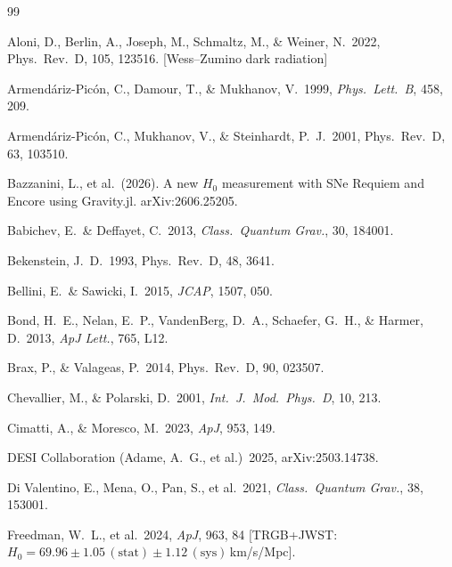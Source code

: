 \documentclass[12pt,a4paper]{article}
\newcommand{\prd}{Phys.\ Rev.\ D}
\begin{document}
\clearpage

\begin{thebibliography}{99}

Aloni, D., Berlin, A., Joseph, M., Schmaltz, M., \& Weiner, N.\ 2022,
\prd, 105, 123516. [Wess--Zumino dark radiation]

Armend\'ariz-Pic\'on, C., Damour, T., \& Mukhanov, V.\ 1999,
\textit{Phys.\ Lett.\ B}, 458, 209.

Armend\'ariz-Pic\'on, C., Mukhanov, V., \& Steinhardt, P.~J.\ 2001,
\prd, 63, 103510.

Bazzanini, L., et al.\ (2026).
A new $H_0$ measurement with SNe Requiem and Encore using Gravity.jl.
arXiv:2606.25205.

Babichev, E.\ \& Deffayet, C.\ 2013, \textit{Class.\ Quantum Grav.}, 30, 184001.

Bekenstein, J.~D.\ 1993, \prd, 48, 3641.

Bellini, E.\ \& Sawicki, I.\ 2015, \textit{JCAP}, 1507, 050.

Bond, H.~E., Nelan, E.~P., VandenBerg, D.~A., Schaefer, G.~H., \&
Harmer, D.\ 2013, \textit{ApJ Lett.}, 765, L12.

Brax, P., \& Valageas, P.\ 2014, \prd, 90, 023507.

Chevallier, M., \& Polarski, D.\ 2001,
\textit{Int.\ J.\ Mod.\ Phys.\ D}, 10, 213.

Cimatti, A., \& Moresco, M.\ 2023, \textit{ApJ}, 953, 149.

DESI Collaboration (Adame, A.~G., et al.)\ 2025, arXiv:2503.14738.

Di Valentino, E., Mena, O., Pan, S., et al.\ 2021,
\textit{Class.\ Quantum Grav.}, 38, 153001.

Freedman, W.~L., et al.\ 2024, \textit{ApJ}, 963, 84
[TRGB+JWST: $H_0 = 69.96\pm1.05\,(\mathrm{stat})\pm1.12\,(\mathrm{sys})$\,km/s/Mpc].


\end{thebibliography}
\end{document}
